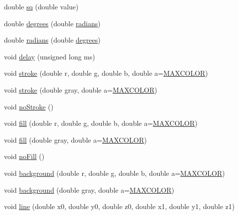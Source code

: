 \begin{DoxyCompactItemize}
double \hyperlink{namespacecprocessing_a5b9c7c8fe6eeabc902cac120592809c6}{sq} (double value)
\item 
double \hyperlink{namespacecprocessing_ab1ad6d58130b9a22ae19489920513d1f}{degrees} (double \hyperlink{namespacecprocessing_a8e4f15390e12437ed626441da1cc767d}{radians})
\item 
double \hyperlink{namespacecprocessing_a8e4f15390e12437ed626441da1cc767d}{radians} (double \hyperlink{namespacecprocessing_ab1ad6d58130b9a22ae19489920513d1f}{degrees})
\item 
void \hyperlink{namespacecprocessing_a764fa48b70712470f922b98463b77bf4}{delay} (unsigned long ms)
\item 
void \hyperlink{namespacecprocessing_a7c1883da06a9fc2827b361d815e187ca}{stroke} (double r, double g, double b, double a=\hyperlink{color_8hpp_acd61a23b73083918e86cc349ed38c076}{\-M\-A\-X\-C\-O\-L\-O\-R})
\item 
void \hyperlink{namespacecprocessing_ad11d761eb5722c023b181750127da794}{stroke} (double gray, double a=\hyperlink{color_8hpp_acd61a23b73083918e86cc349ed38c076}{\-M\-A\-X\-C\-O\-L\-O\-R})
\item 
void \hyperlink{namespacecprocessing_a19914d41fcc0d755c4d754800b2f5147}{no\-Stroke} ()
\item 
void \hyperlink{namespacecprocessing_a1d7a78063b1f888c9d8a02e3fb751691}{fill} (double r, double g, double b, double a=\hyperlink{color_8hpp_acd61a23b73083918e86cc349ed38c076}{\-M\-A\-X\-C\-O\-L\-O\-R})
\item 
void \hyperlink{namespacecprocessing_aabb2ff8c883f75ff0993842e65802e10}{fill} (double gray, double a=\hyperlink{color_8hpp_acd61a23b73083918e86cc349ed38c076}{\-M\-A\-X\-C\-O\-L\-O\-R})
\item 
void \hyperlink{namespacecprocessing_ae8ea8721096bb466fdbb304304ff9e1e}{no\-Fill} ()
\item 
void \hyperlink{namespacecprocessing_ae28ec65927b7f3edc953cacd9a67543a}{background} (double r, double g, double b, double a=\hyperlink{color_8hpp_acd61a23b73083918e86cc349ed38c076}{\-M\-A\-X\-C\-O\-L\-O\-R})
\item 
void \hyperlink{namespacecprocessing_a73406cb49ec7dad230a67ca56c19597a}{background} (double gray, double a=\hyperlink{color_8hpp_acd61a23b73083918e86cc349ed38c076}{\-M\-A\-X\-C\-O\-L\-O\-R})
\item 
void \hyperlink{namespacecprocessing_a22b5de4fc02daa5ad47f4f277465cc18}{line} (double x0, double y0, double z0, double x1, double y1, double z1)
\item 

\end{DoxyCompactItemize}
